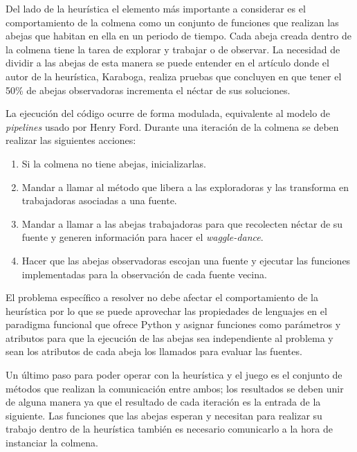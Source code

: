 Del lado de la heurística el elemento más importante a considerar es el 
comportamiento de la colmena como un conjunto de funciones que realizan 
las abejas que habitan en ella en un periodo de tiempo. Cada abeja 
creada dentro de la colmena tiene la tarea de explorar y trabajar o 
de observar. La necesidad de dividir a las abejas de esta manera se puede entender 
en el artículo \cite{karaboga2008performance} donde el autor de la heurística, 
Karaboga, realiza pruebas que concluyen en que tener el 50\% de abejas observadoras 
incrementa el néctar de sus soluciones. 

La ejecución del código ocurre de forma modulada, equivalente al modelo de 
\textit{pipelines} usado por Henry Ford. Durante una iteración de la colmena se 
deben realizar las siguientes acciones: 

\begin{enumerate}
\item Si la colmena no tiene abejas, inicializarlas.

\item Mandar a llamar al método que libera a las exploradoras y las transforma en 
trabajadoras asociadas a una fuente.

\item Mandar a llamar a las abejas trabajadoras para que recolecten néctar de su 
fuente y generen información para hacer el \textit{waggle-dance}.

\item Hacer que las abejas observadoras escojan una fuente y ejecutar las 
funciones implementadas para la observación de cada fuente vecina. 
 
\end{enumerate}

El problema específico a resolver no debe afectar el comportamiento de la 
heurística por lo que se puede aprovechar las propiedades de lenguajes en el 
paradigma funcional que ofrece 
Python y asignar funciones como parámetros y atributos para que la ejecución de las abejas 
sea independiente al problema y sean los atributos de cada abeja los 
llamados para evaluar las fuentes.

Un último paso para poder operar con la heurística y el juego es el conjunto 
de métodos que realizan la comunicación entre ambos; los resultados se deben unir de alguna 
manera ya que el resultado de cada iteración es la entrada de la 
siguiente. Las funciones que las abejas esperan y necesitan para realizar su 
trabajo dentro de la heurística también es necesario comunicarlo a la hora 
de instanciar la colmena.

